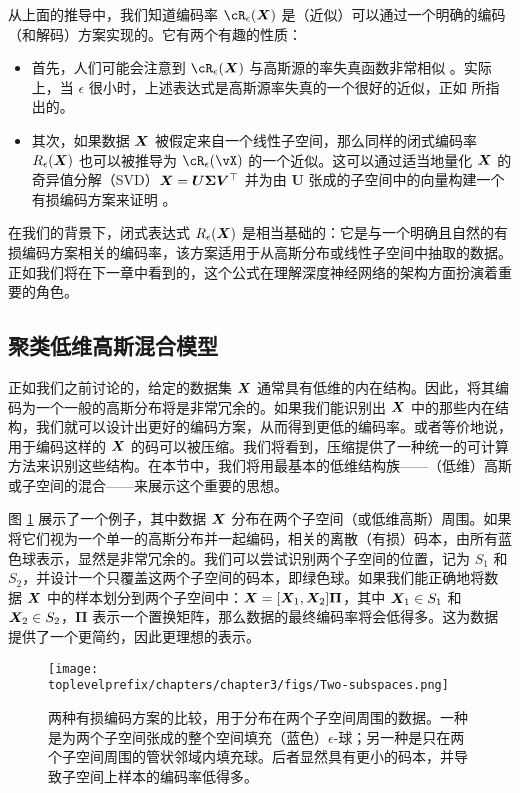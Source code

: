 \documentclass[../../book-main.tex]{subfiles}
\begin{document}
从上面的推导中，我们知道编码率 $\cR_{\epsilon}(\X)$ 是（近似）可以通过一个明确的编码（和解码）方案实现的。它有两个有趣的性质：
\begin{itemize}
	\item 首先，人们可能会注意到 $\cR_{\epsilon}(\X)$ 与高斯源的率失真函数非常相似 \cite{Cover-Thomas}。实际上，当 $\epsilon$ 很小时，上述表达式是高斯源率失真的一个很好的近似，正如 \cite{MaY2007-PAMI} 所指出的。
	\item 其次，如果数据 $\bm{X}$ 被假定来自一个线性子空间，那么同样的闭式编码率 $R_{\epsilon}(\bm{X})$ 也可以被推导为 \(\cR_{\epsilon}(\vX)\) 的一个近似。这可以通过适当地量化 $\bm{X}$ 的奇异值分解（SVD）$\bm{X} = \boldsymbol{U} \boldsymbol{\Sigma}\boldsymbol{V}^\top$ 并为由 $\boldsymbol{U}$ 张成的子空间中的向量构建一个有损编码方案来证明 \cite{MaY2007-PAMI}。
\end{itemize}
在我们的背景下，闭式表达式 $R_{\epsilon}(\bm{X})$ 是相当基础的：它是与一个明确且自然的有损编码方案相关的编码率，该方案适用于从高斯分布或线性子空间中抽取的数据。正如我们将在下一章中看到的，这个公式在理解深度神经网络的架构方面扮演着重要的角色。


\subsection{聚类低维高斯混合模型}
\label{sec:clustering-Gaussians}
正如我们之前讨论的，给定的数据集 $\bm{X}$ 通常具有低维的内在结构。因此，将其编码为一个一般的高斯分布将是非常冗余的。如果我们能识别出 $\bm{X}$ 中的那些内在结构，我们就可以设计出更好的编码方案，从而得到更低的编码率。或者等价地说，用于编码这样的 $\bm{X}$ 的码可以被压缩。我们将看到，压缩提供了一种统一的可计算方法来识别这些结构。在本节中，我们将用最基本的低维结构族——（低维）高斯或子空间的混合——来展示这个重要的思想。

\begin{example}
	图 \ref{fig:two-subspaces} 展示了一个例子，其中数据 $\bm{X}$ 分布在两个子空间（或低维高斯）周围。如果将它们视为一个单一的高斯分布并一起编码，相关的离散（有损）码本，由所有蓝色球表示，显然是非常冗余的。我们可以尝试识别两个子空间的位置，记为 $S_1$ 和 $S_2$，并设计一个只覆盖这两个子空间的码本，即绿色球。如果我们能正确地将数据 $\bm{X}$ 中的样本划分到两个子空间中：$\bm{X} = [\bm{X}_1, \bm{X}_2]\bm \Pi$，其中 $\bm{X}_1 \in S_1$ 和 $\bm{X}_2 \in S_2$，$\bm \Pi$ 表示一个置换矩阵，那么数据的最终编码率将会低得多。这为数据提供了一个更简约，因此更理想的表示。
\end{example}

\begin{figure}
	\centering
	\texttt{[image: \\toplevelprefix/chapters/chapter3/figs/Two-subspaces.png]}
	\caption{两种有损编码方案的比较，用于分布在两个子空间周围的数据。一种是为两个子空间张成的整个空间填充（蓝色）$\epsilon$-球；另一种是只在两个子空间周围的管状邻域内填充球。后者显然具有更小的码本，并导致子空间上样本的编码率低得多。}
	\label{fig:two-subspaces}
\end{figure}
\end{document}
